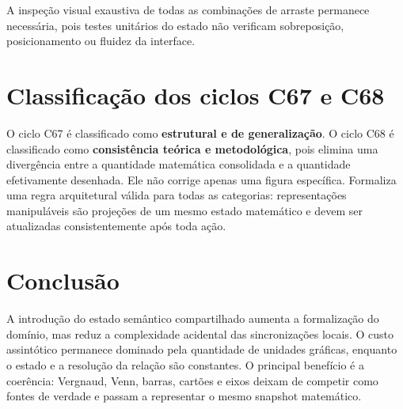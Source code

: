 \documentclass[12pt,a4paper]{article}
\begin{document}
A inspeção visual exaustiva de todas as combinações de arraste permanece necessária, pois testes unitários do estado não verificam sobreposição, posicionamento ou fluidez da interface.

\section{Classificação dos ciclos C67 e C68}

O ciclo C67 é classificado como \textbf{estrutural e de generalização}. O ciclo C68 é classificado como \textbf{consistência teórica e metodológica}, pois elimina uma divergência entre a quantidade matemática consolidada e a quantidade efetivamente desenhada. Ele não corrige apenas uma figura específica. Formaliza uma regra arquitetural válida para todas as categorias: representações manipuláveis são projeções de um mesmo estado matemático e devem ser atualizadas consistentemente após toda ação.

\section{Conclusão}

A introdução do estado semântico compartilhado aumenta a formalização do domínio, mas reduz a complexidade acidental das sincronizações locais. O custo assintótico permanece dominado pela quantidade de unidades gráficas, enquanto o estado e a resolução da relação são constantes. O principal benefício é a coerência: Vergnaud, Venn, barras, cartões e eixos deixam de competir como fontes de verdade e passam a representar o mesmo snapshot matemático.
\end{document}

